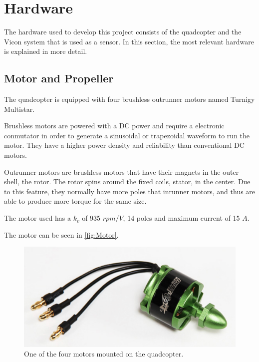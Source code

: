\section{Hardware}
The hardware used to develop this project consists of the quadcopter and the Vicon system that is used as a sensor. In this section, the most relevant hardware is explained in more detail.

\subsection{Motor and Propeller}
The quadcopter is equipped with four brushless outrunner motors named Turnigy Multistar. 

Brushless motors are powered with a DC power and require a electronic conmutator in order to generate a sinusoidal or trapezoidal waveform to run the motor. They have a higher power density and reliability than conventional DC motors.

Outrunner motors are brushless motors that have their magnets in the outer shell, the rotor. The rotor spins around the fixed coils, stator, in the center. Due to this feature, they normally have more poles that inrunner motors, and thus are able to produce more torque for the same size.  

The motor used has a $k_v$ of 935 $rpm/V$, 14 poles and maximum current of 15 $A$. 

The motor can be seen in \autoref{fig:Motor}.
\begin{figure}[H]
	\centering
	\includegraphics[scale=0.5]{figures/motor.png}
	\caption{One of the four motors mounted on the quadcopter.}
	\label{fig:Motor}
\end{figure} 

